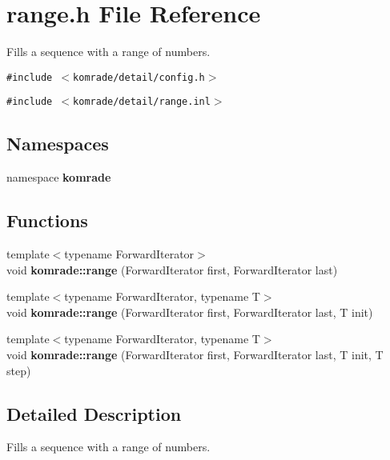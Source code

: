 \section{range.h File Reference}
\label{range_8h}
Fills a sequence with a range of numbers. 

{\tt \#include $<$komrade/detail/config.h$>$}\par
{\tt \#include $<$komrade/detail/range.inl$>$}\par
\subsection*{Namespaces}
\begin{CompactItemize}
\item 
namespace {\bf komrade}
\end{CompactItemize}
\subsection*{Functions}
\begin{CompactItemize}
\item 
{\footnotesize template$<$typename ForwardIterator$>$ }\\void {\bf komrade::range} (ForwardIterator first, ForwardIterator last)
\item 
{\footnotesize template$<$typename ForwardIterator, typename T$>$ }\\void {\bf komrade::range} (ForwardIterator first, ForwardIterator last, T init)
\item 
{\footnotesize template$<$typename ForwardIterator, typename T$>$ }\\void {\bf komrade::range} (ForwardIterator first, ForwardIterator last, T init, T step)
\end{CompactItemize}


\subsection{Detailed Description}
Fills a sequence with a range of numbers. 

